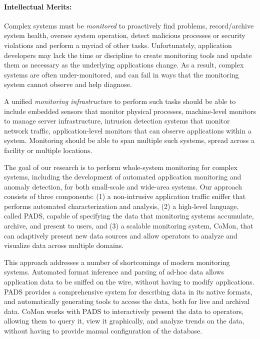 
\paragraph*{Intellectual Merits:} 

Complex systems must be {\em monitored} to proactively find problems,
record/archive system health, oversee system operation, detect
malicious processes or security violations and perform a myriad of
other tasks.  Unfortunately, application developers may lack the time
or discipline to create monitoring tools and update them as necessary
as the underlying applications change. As a result, complex systems
are often under-monitored, and can fail in ways that the monitoring
system cannot observe and help diagnose.

A unified {\em monitoring infrastructure} to perform such tasks should
be able to include embedded sensors that monitor physical processes,
machine-level monitors to manage server infrastructure, intrusion
detection systems that monitor network traffic, application-level
monitors that can observe applications within a system. Monitoring
should be able to span multiple such systems, spread across a facility
or multiple locations.

The goal of our research is to perform whole-system monitoring for
complex systems, including the development of automated application
monitoring and anomaly detection, for both small-scale and wide-area
systems. Our approach consists of three components: (1) a
non-intrusive application traffic sniffer that performs automated
characterization and analysis, (2) a high-level language, called PADS,
capable of specifying the data that monitoring systems accumulate,
archive, and present to users, and (3) a scalable monitoring system,
CoMon, that can adaptively present new data sources and allow
operators to analyze and visualize data across multiple domains.

This approach addresses a number of shortcomings of modern monitoring
systems. Automated format inference and parsing of ad-hoc data allows
application data to be sniffed on the wire, without having to modify
applications. PADS provides a comprehensive system for describing data
in its native formats, and automatically generating tools to access
the data, both for live and archival data. CoMon works with PADS to
interactively present the data to operators, allowing them to query
it, view it graphically, and analyze trends on the data, without having
to provide manual configuration of the database.

